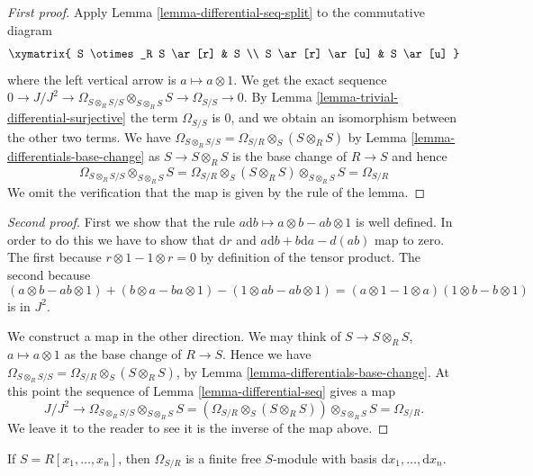 \begin{proof}[First proof]
Apply Lemma \ref{lemma-differential-seq-split} to the commutative diagram
$$
\xymatrix{
S \otimes_R S \ar[r] & S \\
S \ar[r] \ar[u] & S \ar[u]
}
$$
where the left vertical arrow is $a \mapsto a \otimes 1$. We get the
exact sequence
$0 \to J/J^2 \to
\Omega_{S \otimes_R S/S} \otimes_{S \otimes_R S} S \to \Omega_{S/S} \to 0$.
By Lemma \ref{lemma-trivial-differential-surjective}
the term $\Omega_{S/S}$ is $0$, and we obtain an
isomorphism between the other two terms. We have
$\Omega_{S \otimes_R S/S} = \Omega_{S/R} \otimes_S (S \otimes_R S)$
by Lemma \ref{lemma-differentials-base-change} as $S \to S \otimes_R S$
is the base change of $R \to S$ and hence
$$
\Omega_{S \otimes_R S/S} \otimes_{S \otimes_R S} S =
\Omega_{S/R} \otimes_S (S \otimes_R S) \otimes_{S \otimes_R S} S =
\Omega_{S/R}
$$
We omit the verification that the map is given by the rule of the lemma.
\end{proof}

\begin{proof}[Second proof]
First we show that the rule $a \text{d} b \mapsto a \otimes b - ab \otimes 1$
is well defined. In order to do this we have to show
that $\text{d}r$ and $a\text{d}b + b \text{d}a - d(ab)$ map to zero.
The first because $r \otimes 1 - 1 \otimes r = 0$ by definition
of the tensor product. The second because
$$
(a \otimes b - ab \otimes 1) +
(b \otimes a - ba \otimes 1) -
(1 \otimes ab - ab \otimes 1)
=
(a \otimes 1 - 1\otimes a)(1\otimes b - b \otimes 1)
$$
is in $J^2$.

\medskip\noindent
We construct a map in the other direction.
We may think of $S \to S \otimes_R S$, $a \mapsto a \otimes 1$
as the base change of $R \to S$. Hence we have
$\Omega_{S \otimes_R S/S} = \Omega_{S/R} \otimes_S (S \otimes_R S)$,
by Lemma \ref{lemma-differentials-base-change}.
At this point the sequence of Lemma \ref{lemma-differential-seq} gives a map
$$
J/J^2  \to \Omega_{S \otimes_R S/ S} \otimes_{S \otimes_R S} S
= (\Omega_{S/R} \otimes_S (S \otimes_R S))\otimes_{S \otimes_R S} S
= \Omega_{S/R}.
$$
We leave it to the reader to see it is the inverse of the map
above.
\end{proof}




\begin{lemma}
\label{lemma-differentials-polynomial-ring}
If $S = R[x_1, \ldots, x_n]$, then
$\Omega_{S/R}$ is a finite free $S$-module with
basis $\text{d}x_1, \ldots, \text{d}x_n$.
\end{lemma}

